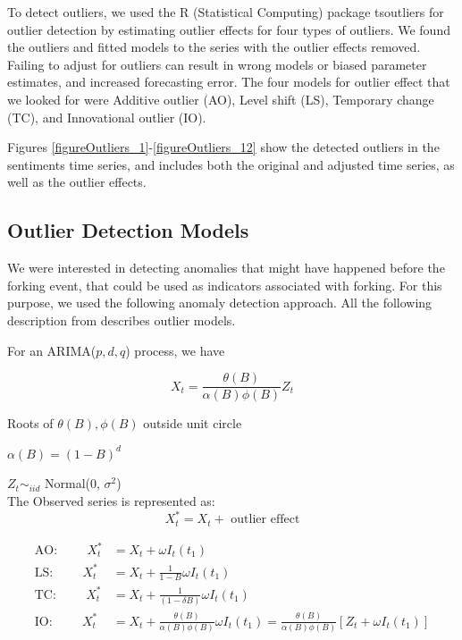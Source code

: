 \documentclass[12pt,letterpaper]{gthesis2}  %
\begin{document}
To detect outliers, we used the R (Statistical Computing) \cite{R} package tsoutliers \cite{Lopez} for outlier detection by estimating outlier effects for four types of outliers. We found the outliers and fitted models to the series with the outlier effects removed. Failing to adjust for outliers can result in wrong models or biased parameter estimates, and increased forecasting error. The four models for outlier effect that we looked for were Additive outlier (AO), Level shift (LS), Temporary change (TC), and Innovational outlier (IO).

Figures \ref{figureOutliers_1}-\ref{figureOutliers_12} show the detected outliers in the sentiments time series, and includes both the original and adjusted time series, as well as the outlier effects.

\subsection{Outlier Detection Models}
\label{OutlierDetectionModels}
We were interested in detecting anomalies that might have happened before the forking event, that could be used as indicators associated with forking. For this purpose, we used the following anomaly detection approach. All the following description from \cite{Chen} describes outlier models. 

For an ARIMA($p, d, q$) process, we have 

\begin{equation}
X_t = \frac{\theta(B)}{\alpha(B) \phi(B)} Z_t 
\end{equation}

Roots of $\theta(B), \phi(B)$ outside unit circle

$\alpha(B) = (1 - B)^d$

$Z_t \sim_{iid}$ Normal(0, $\sigma^2$) \\

The Observed series is represented as:
\begin{equation}
X^*_t = X_t + \text{ outlier effect}
\end{equation}

\begin{align}
\text{AO:}\hspace{1cm}X^*_t &= X_t + \omega I_t(t_1) \\
\text{LS:}\hspace{1cm}X^*_t &= X_t + \frac{1}{1 - B} \omega I_t(t_1) \\
\text{TC:}\hspace{1cm}X^*_t &= X_t + \frac{1}{(1 - \delta B)} \omega I_t(t_1) \\
\text{IO:}\hspace{1cm}X^*_t &= X_t + \frac{\theta(B)}{\alpha(B) \phi(B)} \omega I_t(t_1) = \frac{\theta(B)}{\alpha(B) \phi(B)}\left[Z_t + \omega I_t(t_1)\right]
\end{align}
\end{document}
